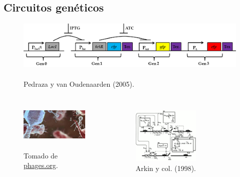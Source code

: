 \documentclass[xcolor=dvipsnames]{beamer}
\begin{document}
\subsection{Circuitos gen\'eticos}
\begin{frame}
  \begin{figure}[p]
    \centering
    \includegraphics[width=1\textwidth]{Pcon-circuit_simple}~\\
    \tiny Pedraza y van Oudenaarden (2005).
  \end{figure}

\begin{columns}[c]


\begin{figure}[p]
    \centering
    \includegraphics[width=\textwidth]{phageim}~\\
    \tiny Tomado de \url{phages.org}.
\end{figure}

\vspace{-5mm}
\begin{figure}[p]
    \centering
    \includegraphics[width=0.6\textwidth]{con-biocircuits_comp.png}~\\
    \tiny Arkin y col. (1998).
\end{figure}
\end{columns}
\end{frame}
\end{document}
